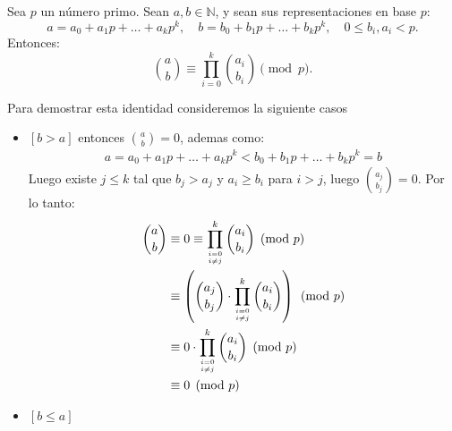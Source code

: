 
    Sea $p$ un número primo. Sean $a, b \in \mathbb{N}$, y sean sus representaciones en base $p$:
    \[
    a = a_0 + a_1 p + \dots + a_k p^k,\quad b = b_0 + b_1 p + \dots + b_k p^k,\quad 0 \le b_i, a_i < p.
    \]
    Entonces:
    \[
    \binom{a}{b} \equiv \prod_{i=0}^{k} \binom{a_i}{b_i} \pmod{p}.
    \]
    
    Para demostrar esta identidad consideremos la siguiente casos
    \begin{itemize}
        \item  $[b>a]$ entonces $\binom{a}{b} = 0$, ademas como:
        \begin{align*}
            a= a_0 + a_1 p + \dots + a_k p^k < b_0 + b_1 p + \dots + b_k p^k = b
        \end{align*}
        Luego existe $j \leq k$ tal que $b_j > a_j$ y $a_i \geq b_i$ para $i>j$, luego $\binom{a_j}{b_j} = 0$.  Por lo tanto:
        \begin{align*}
            \binom{a}{b} &\equiv 0 \equiv \prod_{i=0 \atop i\neq j}^{k} \binom{a_i}{b_i} \pmod{p}\\
            &\equiv \left(
                \binom{a_j}{b_j} \cdot \prod_{i=0 \atop i\neq j}^{k} \binom{a_i}{b_i} 
            \right)\pmod{p}\\
            &\equiv 0\cdot \prod_{i=0\atop i\neq j}^{k} \binom{a_i}{b_i} \pmod{p}\\
            &\equiv 0 \pmod{p}\\
        \end{align*}
    \item $[b \leq a]$ 
    

\end{itemize}
